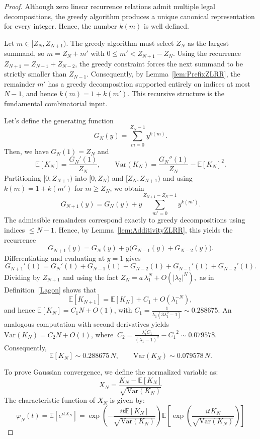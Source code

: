 \documentclass[11pt]{amsart}
\theoremstyle{plain}
\numberwithin{equation}{section} %
\numberwithin{table}{section} %
\numberwithin{figure}{section}
\begin{document}
	\begin{proof}
		Although zero linear recurrence relations admit multiple legal
		decompositions, the greedy algorithm produces a unique canonical
		representation for every integer. Hence, the number  $k(m)$ is well defined.
		
		Let $m\in[Z_N,Z_{N+1})$. The greedy algorithm must select $Z_N$ as the
		largest summand, so $m=Z_N+m'$ with $0\le m'<Z_{N+1}-Z_N$.
		Using the recurrence $Z_{N+1}=Z_{N-1}+Z_{N-2}$, the greedy constraint
		forces the next summand to be strictly smaller than $Z_{N-1}$.
		Consequently, by Lemma~\ref{lem:PrefixZLRR}, 
		the remainder $m'$ has a greedy decomposition supported
		entirely on indices at most $N-1$, and hence
		$
		k(m)=1+k(m').
		$
		This recursive structure is the fundamental combinatorial input.
		
		Let's define the generating function
		\[
		G_N(y)=\sum_{m=0}^{Z_N-1}y^{k(m)}.
		\]
		Then, we have  $G_N(1)=Z_N$ and
		\[
		\mathbb{E}[K_N]=\frac{G_N'(1)}{Z_N},
		\qquad
		\mathrm{Var}(K_N)=\frac{G_N''(1)}{Z_N}-\mathbb{E}[K_N]^2.
		\]
		Partitioning $[0,Z_{N+1})$ into $[0,Z_N)$ and $[Z_N,Z_{N+1})$ and using
		$k(m)=1+k(m')$ for $m\ge Z_N$, we obtain
		\[
		G_{N+1}(y)=G_N(y)+y\sum_{m'=0}^{Z_{N+1}-Z_N-1}y^{k(m')}.
		\]
		The admissible remainders correspond exactly to greedy decompositions
		using indices $\le N-1$.  Hence, by Lemma~\ref{lem:AdditivityZLRR}, this  yields the recurrence
		\[
		G_{N+1}(y)=G_N(y)+y\bigl(G_{N-1}(y)+G_{N-2}(y)\bigr).
		\]
		Differentiating and evaluating at $y=1$ gives
		\[
		G_{N+1}'(1)=G_N'(1)+G_{N-1}(1)+G_{N-2}(1)+G_{N-1}'(1)+G_{N-2}'(1).
		\]
		Dividing by $Z_{N+1}$ and using the fact $Z_N=   a\,\lambda_1^N + O(|\lambda_2|^N),$ as in Definition~\ref{Lagon}  
		shows that
		\[
		\mathbb{E}[K_{N+1}]=\mathbb{E}[K_N]+C_1+O(\lambda_1^{-N}),
		\]
		and hence $\mathbb{E}[K_N]=C_1N+O(1)$, with 
		$C_1= \frac{1}{\lambda_1  \left(3 \lambda_1^{2}-1\right)}\sim 0.288675.$
		An analogous computation with 
		second derivatives yields
		$\mathrm{Var}(K_N)=C_2 N+O(1)$, where 
		$\ C_2= \frac{\lambda_1^{2} \mathit{C_1}}{\left(\lambda_1 -1\right)^{2}}-\mathit{C_1}^{2}\sim 0.079578.$
		Consequently,
		\[
		\mathbb{E}[K_N]\sim 0.288675 \,N,
		\qquad
		\mathrm{Var}(K_N)\sim 0.079578\,N.
		\]
		
		
		To prove Gaussian convergence,   we define the normalized variable as:
		\[
		X_N = \frac{K_N - \mathbb{E}[K_N]}{\sqrt{\text{Var}(K_N)}}
		\]
		The characteristic function of $X_N$ is given by:
		\[
		\varphi_N(t) = \mathbb{E}\left[e^{itX_N}\right] = \exp\left( -\frac{it\mathbb{E}[K_N]}{\sqrt{\text{Var}(K_N)}} \right) \mathbb{E}\left[ \exp\left( \frac{itK_N}{\sqrt{\text{Var}(K_N)}} \right) \right]
		\]
		

\end{proof}
\end{document}
